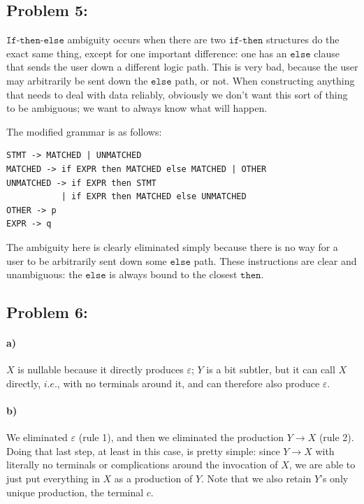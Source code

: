 \documentclass[a4paper]{article}
\begin{document}
\subsection*{Problem 5:}

$\texttt{If-then-else}$ ambiguity occurs when there are two $\texttt{if-then}$ structures do the exact same thing, except for one important difference: one has an $\texttt{else}$ clause that sends the user down a different logic path. This is very bad, because the user may arbitrarily be sent down the $\texttt{else}$ path, or not. When constructing anything that needs to deal with data reliably, obviously we don't want this sort of thing to be ambiguous; we want to always know what will happen.

The modified grammar is as follows:

\begin{verbatim}
STMT -> MATCHED | UNMATCHED
MATCHED -> if EXPR then MATCHED else MATCHED | OTHER
UNMATCHED -> if EXPR then STMT
           | if EXPR then MATCHED else UNMATCHED
OTHER -> p
EXPR -> q
\end{verbatim}

The ambiguity here is clearly eliminated simply because there is no way for a user to be arbitrarily sent down some $\texttt{else}$ path. These instructions are clear and unambiguous: the $\texttt{else}$ is always bound to the closest $\texttt{then}$.

\subsection*{Problem 6:} 

\paragraph{a)} $X$ is nullable because it directly produces $\varepsilon$; $Y$ is a bit subtler, but it can call $X$ directly, $\textit{i.e.}$, with no terminals around it, and can therefore also produce $\varepsilon$.

\paragraph{b)} We eliminated $\varepsilon$ (rule 1), and then we eliminated the production $Y \to X$ (rule 2). Doing that last step, at least in this case, is pretty simple: since $Y \to X$ with literally no terminals or complications around the invocation of $X$, we are able to just put everything in $X$ as a production of $Y$. Note that we also retain $Y$'s only unique production, the terminal $c$.
\end{document}
